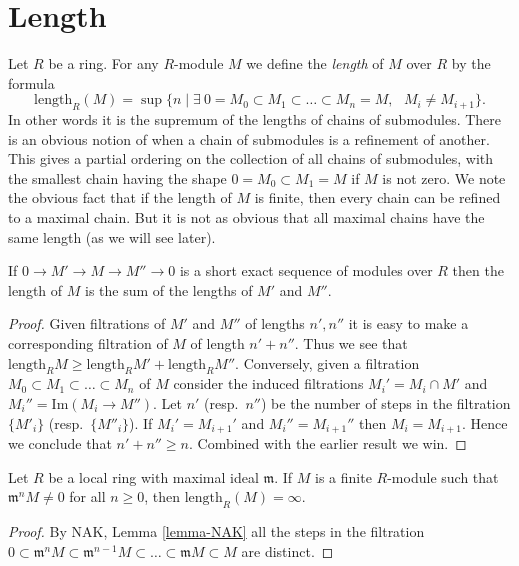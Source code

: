 \section{Length}
\label{section-length}

\noindent
Let $R$ be a ring. For any $R$-module $M$
we define the {\it length} of $M$ over $R$ by the
formula
$$
\text{length}_R(M)
=
\sup
\{
n
\mid
\exists\ 0 = M_0 \subset M_1 \subset \ldots \subset M_n = M,
\text{ }M_i \not= M_{i + 1}
\}.
$$
In other words it is the supremum of the lengths of chains
of submodules. There is an obvious notion of when a chain
of submodules is a refinement of another. This gives a partial
ordering on the collection of all chains of submodules,
with the smallest chain having the shape $0 = M_0 \subset M_1 = M$
if $M$ is not zero.
We note the obvious fact that if the length of
$M$ is finite, then every chain can be refined to a
maximal chain. But it is not as obvious that all maximal
chains have the same length (as we will see later).

\begin{lemma}
\label{lemma-length-additive}
If $0 \to M' \to M \to M'' \to 0$
is a short exact sequence of modules over $R$ then
the length of $M$ is the sum of the
lengths of $M'$ and $M''$.
\end{lemma}

\begin{proof}
Given filtrations of $M'$ and $M''$ of lengths $n', n''$
it is easy to make a corresponding filtration of $M$
of length $n' + n''$. Thus we see that $\text{length}_R M
\geq \text{length}_R M' + \text{length}_R M''$.
Conversely, given a filtration
$M_0 \subset M_1 \subset \ldots \subset M_n$ of
$M$ consider the induced filtrations
$M_i' = M_i \cap M'$ and $M_i'' = \text{Im}(M_i \to M'')$.
Let $n'$ (resp.\ $n''$) be the number of steps in the filtration
$\{M'_i\}$ (resp.\ $\{M''_i\}$).
If $M_i' = M_{i + 1}'$ and $M_i'' = M_{i + 1}''$ then
$M_i = M_{i + 1}$. Hence we conclude that $n' + n'' \geq n$.
Combined with the earlier result we win.
\end{proof}

\begin{lemma}
\label{lemma-length-infinite}
Let $R$ be a local ring with maximal ideal $\mathfrak m$.
If $M$ is a finite $R$-module such that
$\mathfrak m^n M \not = 0$ for all $n\geq 0$,
then $\text{length}_R(M) = \infty$.
\end{lemma}

\begin{proof}
By NAK, Lemma \ref{lemma-NAK} all the steps in the filtration
$0 \subset \mathfrak m^n M
\subset \mathfrak m^{n-1} M \subset \ldots \subset
\mathfrak m M \subset M$ are distinct.
\end{proof}

